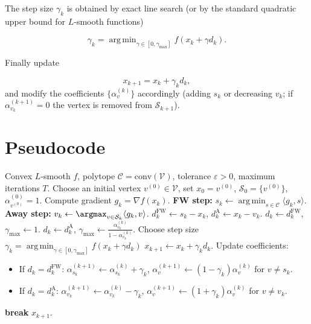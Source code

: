 \documentclass{article}
\newcommand{\argmin}{\mathop{\mathrm{arg\,min}}}
\newcommand{\conv}{\mathrm{conv}}
\begin{document}
The step size $\gamma_k$ is obtained by exact line search (or by the standard
quadratic upper bound for $L$‑smooth functions)

\[
\gamma_k = \argmin_{\gamma\in[0,\gamma_{\max}]}
f(x_k+\gamma d_k).
\]

Finally update  

\[
x_{k+1}=x_k+\gamma_k d_k,
\]
and modify the coefficients $\{\alpha_v^{(k)}\}$ accordingly (adding $s_k$ or
decreasing $v_k$; if $\alpha_{v_k}^{(k+1)}=0$ the vertex is removed from
$\mathcal S_{k+1}$).

\section*{Pseudocode}
\begin{algorithm}[H]
\caption{Away‑Step Frank–Wolfe (AFW)}
\begin{algorithmic}[1]
\Require Convex $L$‑smooth $f$, polytope $\mathcal C=\conv(\mathcal V)$,
tolerance $\varepsilon>0$, maximum iterations $T$.
\State Choose an initial vertex $v^{(0)}\in\mathcal V$, set $x_0=v^{(0)}$,
$\mathcal S_0=\{v^{(0)}\}$, $\alpha_{v^{(0)}}^{(0)}=1$.
    \State Compute gradient $g_k=\nabla f(x_k)$.
    \State \textbf{FW step: } $s_k \gets \argmin_{s\in\mathcal C}\langle g_k,s\rangle$.
    \State \textbf{Away step: } $v_k \gets \argmax_{v\in\mathcal S_k}\langle g_k,v\rangle$.
    \State $d^{\mathrm{FW}}_k \gets s_k-x_k$, \quad
          $d^{\mathrm{A}}_k \gets x_k-v_k$.
        \State $d_k \gets d^{\mathrm{FW}}_k$, $\gamma_{\max}\gets 1$.
    \Else
        \State $d_k \gets d^{\mathrm{A}}_k$, 
        $\displaystyle\gamma_{\max}\gets\frac{\alpha_{v_k}^{(k)}}{1-\alpha_{v_k}^{(k)}}$.
    \EndIf
    \State Choose step size $\displaystyle
        \gamma_k=\argmin_{\gamma\in[0,\gamma_{\max}]}
        f(x_k+\gamma d_k)$ 
    \State $x_{k+1}\gets x_k+\gamma_k d_k$.
    \State Update coefficients:
    \begin{itemize}
        \item If $d_k=d^{\mathrm{FW}}_k$: 
            $\alpha_{s_k}^{(k+1)}\gets \alpha_{s_k}^{(k)}+\gamma_k$,
            $\alpha_v^{(k+1)}\gets (1-\gamma_k)\alpha_v^{(k)}$ for $v\neq s_k$.
        \item If $d_k=d^{\mathrm{A}}_k$:
            $\alpha_{v_k}^{(k+1)}\gets \alpha_{v_k}^{(k)}-\gamma_k$,
            $\alpha_v^{(k+1)}\gets (1+\gamma_k)\alpha_v^{(k)}$ for $v\neq v_k$.
    \end{itemize}
        \State \textbf{break}
    \EndIf
\EndFor
\State \Return $x_{k+1}$.
\end{algorithmic}
\end{algorithm}
\end{document}
